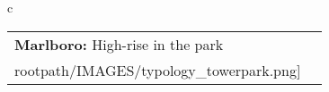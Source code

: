 \begin{table}[H]
        \begin{tabular}{c}
        \begin{tabular}{m{1.5in} m{2in}}
\textbf{Marlboro:} {High-rise in the park} & \texttt{[image: \\rootpath/IMAGES/typology\_towerpark.png]}
\end{tabular}\end{tabular}
        \end{table}